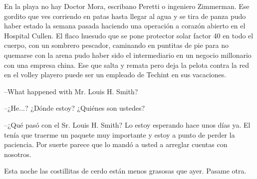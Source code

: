 \documentclass[12pt,twoside,openright,a5paper]{book}
\begin{document}
\afterpage{}
\vspace{0.5cm}
\hrulefill\hspace{0.2cm} \decofourleft\decofourright \hspace{0.2cm} \hrulefill
\vspace{0.5cm}

En la playa no hay Doctor Mora, escribano Peretti
o ingeniero Zimmerman. Ese gordito que ves corriendo en patas hasta llegar
al agua y se tira de panza pudo haber estado la semana pasada haciendo una
operación a corazón abierto en el Hospital Cullen. El flaco huesudo que se
pone protector solar factor 40 en todo el cuerpo, con un sombrero pescador,
caminando en puntitas de pie para no quemarse con la arena pudo haber sido
el intermediario en un negocio millonario con una empresa china. Ese que
salta y remata pero deja la pelota contra la red en el volley playero puede
ser un empleado de Techint en sus vacaciones.


\vspace{0.5cm}
\hrulefill\hspace{0.2cm} \decofourleft\decofourright \hspace{0.2cm} \hrulefill
\vspace{0.5cm}

\---What happened with Mr. Louis H. Smith?

\---¿He...? ¿Dónde estoy? ¿Quiénes son ustedes?

\---¿Qué pasó con el Sr. Louis H. Smith? Lo estoy esperando hace
unos días ya. El tenía que traerme un paquete muy importante y estoy a
punto de perder la paciencia. Por suerte parece que lo mandó a usted a arreglar
cuentas con nosotros.


\vspace{0.5cm}
\hrulefill\hspace{0.2cm} \decofourleft\decofourright \hspace{0.2cm} \hrulefill
\vspace{0.5cm}

Esta noche las costillitas de cerdo están menos grasosas que ayer. Pasame
otra.


\vspace{0.5cm}
\hrulefill\hspace{0.2cm} \decofourleft\decofourright \hspace{0.2cm} \hrulefill
\vspace{0.5cm}
\end{document}
